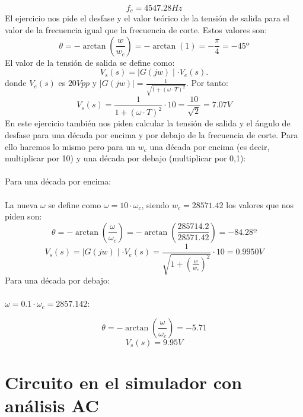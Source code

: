 \documentclass[11pt,letterpaper]{article}
\begin{document}
\begin{equation}
f_c= 4547.28 Hz
\end{equation}
El ejercicio nos pide el desfase y el valor teórico de la tensión de salida para el valor de la frecuencia igual que la frecuencia de corte. Estos valores son:
\begin{equation}
	\boxed{	\theta= -\arctan \left( \frac{w}{w_c} \right) =-\arctan(1)=-\frac{\pi}{4}=-45º}
\end{equation}
El valor de la tensión de salida se define como:
\[
	V_s(s)= \mid G(jw) \mid \cdot V_e(s)
.\]
donde $V_e(s)$  es $20 Vpp$ y  $ \mid G(jw) \mid =\frac{1}{\sqrt{1+\left( \omega\cdot T \right) ^2}}$. Por tanto:
\begin{equation}
	\boxed{V_s(s)=\frac{1}{1+\left( \omega\cdot T \right) ^2}\cdot 10=\frac{10}{\sqrt{2} }=7.07 V}
\end{equation}
En este ejercicio también nos piden calcular la tensión de salida y el ángulo de desfase para una década por encima y por debajo de la frecuencia de corte. Para ello haremos lo mismo pero para un $w_c$ una década por encima (es decir, multiplicar por 10) y una década por debajo (multiplicar por 0,1):\\
\\
Para una década por encima:\\
\\
La nueva $\omega$ se define como $\omega=10\cdot \omega_c$, siendo $w_c=28571.42$ los valores que nos piden son:
\begin{equation}
	\boxed{\theta= -\arctan\left( \frac{\omega}{\omega_c} \right) = -\arctan\left( \frac{285714.2}{28571.42} \right) =-84.28º}
\end{equation}
\begin{equation}
\boxed{V_s\left( s \right) = \mid G(jw) \mid \cdot V_e(s)=\frac{1}{\sqrt{1+\left( \frac{w}{w_c} \right)^2}} \cdot 10= 0.9950 V}
\end{equation}
Para una década por debajo:\\
\\
$\omega=0.1\cdot \omega_c= 2857.142$:

\begin{equation}
	\boxed{\theta=-\arctan \left( \frac{\omega}{\omega_c} \right) =-5.71}
\end{equation}
 \begin{equation}
	 \boxed{V_s\left( s \right) = 9.95 V}
\end{equation}

\section{Circuito en el simulador con análisis AC}%
\label{sec:Circuito en el simulador con análisis AC}
\end{document}

